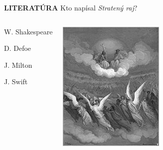 \documentclass[dvipsnames]{beamer}
\begin{document}
\begin{frame}
	\textbf{LITERATÚRA}
	\vskip 3mm
	Kto  napísal \textit{Stratený raj}?
	\begin{columns}
	\begin{enumerate}
		\item W. Shakespeare
		\item D. Defoe
		\textcolor{g}{\item[\textcolor{g}{3.}] J. Milton}\setcounter{enumi}{3}

		\item J. Swift

	\end{enumerate}
		\includegraphics[scale=0.75]{lost}

	\end{columns}
\end{frame}
\end{document}
